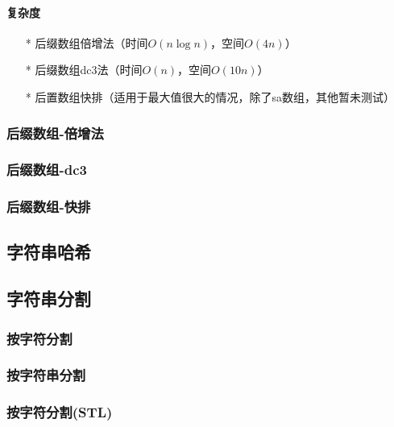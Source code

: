 \paragraph{复杂度}
\begin{itemize}
    \item[*] 后缀数组倍增法（时间$O(n\log n)$，空间$O(4n)$）
    \item[*] 后缀数组dc3法（时间$O(n)$，空间$O(10n)$）
    \item[*] 后置数组快排（适用于最大值很大的情况，除了sa数组，其他暂未测试）
\end{itemize}

\subsubsection{后缀数组-倍增法}


\subsubsection{后缀数组-dc3}


\subsubsection{后缀数组-快排}


\subsection{字符串哈希}


\subsection{字符串分割}

\subsubsection{按字符分割}


\subsubsection{按字符串分割}


\subsubsection{按字符分割(STL)}

